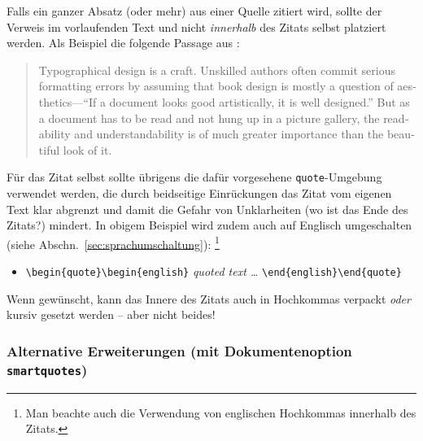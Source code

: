 Falls ein ganzer Absatz (oder mehr) aus einer Quelle zitiert wird, sollte der Verweis im vorlaufenden Text und nicht
\emph{innerhalb} des Zitats selbst platziert werden. Als Beispiel die folgende Passage aus \cite{Oetiker2021}:
%
\begin{quote}\begin{english}
 Typographical design is a craft. Unskilled authors often commit serious formatting errors by assuming
 that book design is mostly a question of aesthetics---``If a document looks good artistically, it is
 well designed.'' But as a document has to be read and not hung up in a picture gallery, the
 readability and understandability is of much greater importance than the beautiful look of it.
\end{english}\end{quote}
%
Für das Zitat selbst sollte übrigens die dafür vorgesehene \texttt{quote}-Umgebung verwendet werden, die durch
beidseitige Einrückungen das Zitat vom eigenen Text klar abgrenzt und damit die Gefahr von Unklarheiten (wo ist das
Ende des Zitats?) mindert. In obigem Beispiel wird zudem auch auf Englisch umgeschalten (siehe Abschn.\
\ref{sec:sprachumschaltung}):%
\footnote{Man beachte auch die Verwendung von englischen Hochkommas innerhalb des Zitats.}
%
\begin{itemize}
 \item[] \verb!\begin{quote}\begin{english}! \emph{quoted text \ldots} \verb!\end{english}\end{quote}!
\end{itemize}
%
Wenn gewünscht, kann das Innere des Zitats auch in Hochkommas verpackt 
\emph{oder} kursiv gesetzt werden -- aber nicht beides!

\subsubsection{Alternative Erweiterungen (mit Dokumentenoption \texttt{smartquotes})}


